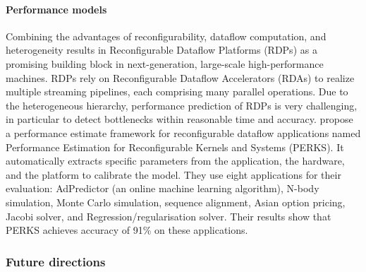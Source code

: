 \paragraph{Performance models}
    Combining the advantages of reconfigurability, dataflow computation, and heterogeneity results in %
    Reconfigurable Dataflow Platforms (RDPs) as a promising building block in %
    next-generation, large-scale high-performance machines. RDPs rely on %
    Reconfigurable Dataflow Accelerators (RDAs) to realize multiple streaming pipelines, each %
    comprising many parallel operations. Due to the %
    heterogeneous hierarchy, 
    performance prediction of RDPs is very challenging, in particular to detect bottlenecks within reasonable time and accuracy. %
\citet{Yasudo2021AnalyticalPlatforms,Yasudo2018PerformancePlatforms} %
propose a performance estimate framework for reconfigurable dataflow applications %
    named Performance Estimation for Reconfigurable Kernels and Systems (PERKS). %
    It %
    automatically extracts specific parameters from the application, the hardware, and the platform to calibrate the model. They use eight applications for their evaluation: AdPredictor (an online machine learning algorithm), N-body simulation, Monte Carlo simulation, sequence alignment, Asian option pricing, Jacobi solver, and Regression/regularisation solver. Their results show that PERKS achieves %
    accuracy of 91\% on these applications.

\subsubsection*{\bf{Future directions}}
\iffalse
Determining the role of FPGAs in HPC necessitates %
more research and %
raises several %
questions, such as 
1) Do we have to find a permanent position for FPGAs in HPC ecosystems to maximize their impact? %
If so, what would that position be, %
from both architectural system design and application workflow perspectives?,
2) How can we bridge %
the gap between software developers and FPGA programming models and tools? Should we focus on HLS approaches or compiler-specific tools, or a combination of both?,
3) What types of HPC applications can benefit from FPGAs?, and last but not least 4) Are FPGAs cost-efficient in terms of energy and performance to warrant a permanent position in future HPC centers? 
Further research and case studies are required to obtain %
more insights in order to answer %
these questions. This future direction and the corresponding outcomes will indicate how important FPGAs will be in the future of HPC and data centers. 
\fi

